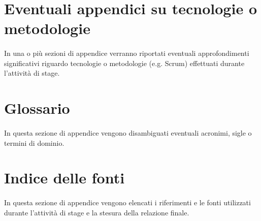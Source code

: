 \documentclass[
article,
10pt, %
oneside, %
BCOR5mm, %
]{scrartcl}
\begin{document}
\appendix{}

\section*{Eventuali appendici su tecnologie o metodologie}
\paragraph{} In una o più sezioni di appendice verranno riportati eventuali
approfondimenti significativi riguardo tecnologie o metodologie (e.g. Scrum)
effettuati durante l'attività di stage.

\section*{Glossario}
\paragraph{} In questa sezione di appendice vengono disambiguati eventuali
acronimi, sigle o termini di dominio.

\section*{Indice delle fonti}
\paragraph{} In questa sezione di appendice vengono elencati i riferimenti e
le fonti utilizzati durante l'attività di stage e la stesura della relazione
finale.
\end{document}
